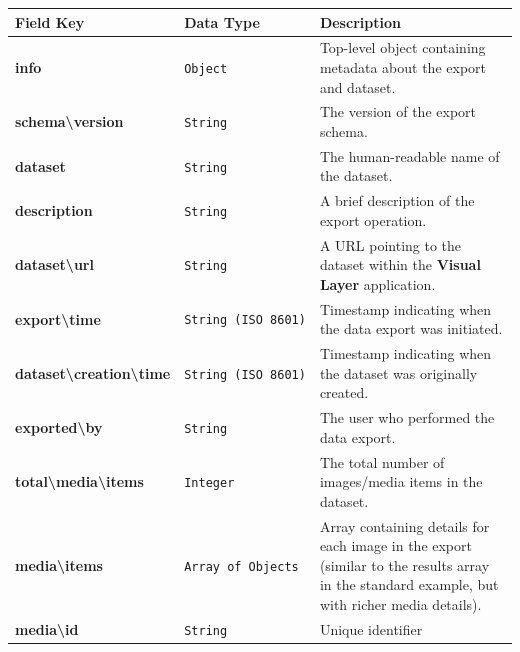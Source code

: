 \documentclass[
  11pt,
  a4paper,
  11pt,
  oneside]{report}
\renewcommand{\toprule}{\hline}
\renewcommand{\midrule}{\hline}
\renewcommand{\bottomrule}{\hline}
\begin{document}
\begin{longtable}[]{@{}
  >{\raggedright\arraybackslash}p{}
  >{\raggedright\arraybackslash}p{}
  >{\raggedright\arraybackslash}p{}@{}}
\toprule\noalign{}
\begin{minipage}[b]{\linewidth}\raggedright
\textbf{Field Key}
\end{minipage} & \begin{minipage}[b]{\linewidth}\raggedright
\textbf{Data Type}
\end{minipage} & \begin{minipage}[b]{\linewidth}\raggedright
\textbf{Description}
\end{minipage} \\
\midrule\noalign{}
\endhead
\bottomrule\noalign{}
\endlastfoot
\textbf{info} & \texttt{Object} & Top-level object containing metadata
about the export and dataset. \\
\textbf{schema\textbackslash version} & \texttt{String} & The version of
the export schema. \\
\textbf{dataset} & \texttt{String} & The human-readable name of the
dataset. \\
\textbf{description} & \texttt{String} & A brief description of the
export operation. \\
\textbf{dataset\textbackslash url} & \texttt{String} & A URL pointing to
the dataset within the \textbf{Visual Layer} application. \\
\textbf{export\textbackslash time} & \texttt{String\ (ISO\ 8601)} &
Timestamp indicating when the data export was initiated. \\
\textbf{dataset\textbackslash creation\textbackslash time} &
\texttt{String\ (ISO\ 8601)} & Timestamp indicating when the dataset was
originally created. \\
\textbf{exported\textbackslash by} & \texttt{String} & The user who
performed the data export. \\
\textbf{total\textbackslash media\textbackslash items} &
\texttt{Integer} & The total number of images/media items in the
dataset. \\
\textbf{media\textbackslash items} & \texttt{Array\ of\ Objects} & Array
containing details for each image in the export (similar to the results
array in the standard example, but with richer media details). \\
\textbf{media\textbackslash id} & \texttt{String} & Unique identifier

\end{longtable}
\end{document}
